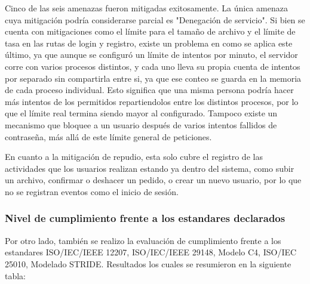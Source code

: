 Cinco de las seis amenazas fueron mitigadas exitosamente. La única amenaza cuya mitigación podría considerarse parcial es "Denegación de servicio". Si bien se cuenta con mitigaciones como el límite para el tamaño de archivo y el límite de tasa en las rutas de login y registro, existe un problema en como se aplica este último, ya que aunque se configuró un límite de intentos por minuto, el servidor corre con varios procesos distintos, y cada uno lleva su propia cuenta de intentos por separado sin compartirla entre si, ya que ese conteo se guarda en la memoria de cada proceso individual. Esto significa que una misma persona podría hacer más intentos de los permitidos repartiendolos entre los distintos procesos, por lo que el límite real termina siendo mayor al configurado. Tampoco existe un mecanismo que bloquee a un usuario después de varios intentos fallidos de contraseña, más allá de este límite general de peticiones.

En cuanto a la mitigación de repudio, esta solo cubre el registro de las actividades que los usuarios realizan estando ya dentro del sistema, como subir un archivo, confirmar o deshacer un pedido, o crear un nuevo usuario, por lo que no se registran eventos como el inicio de sesión.

\subsubsection{Nivel de cumplimiento frente a los estandares declarados}

Por otro lado, también se realizo la evaluación de cumplimiento frente a los estandares ISO/IEC/IEEE 12207, ISO/IEC/IEEE 29148, Modelo C4, ISO/IEC 25010, Modelado STRIDE. Resultados los cuales se resumieron en la siguiente tabla: 

